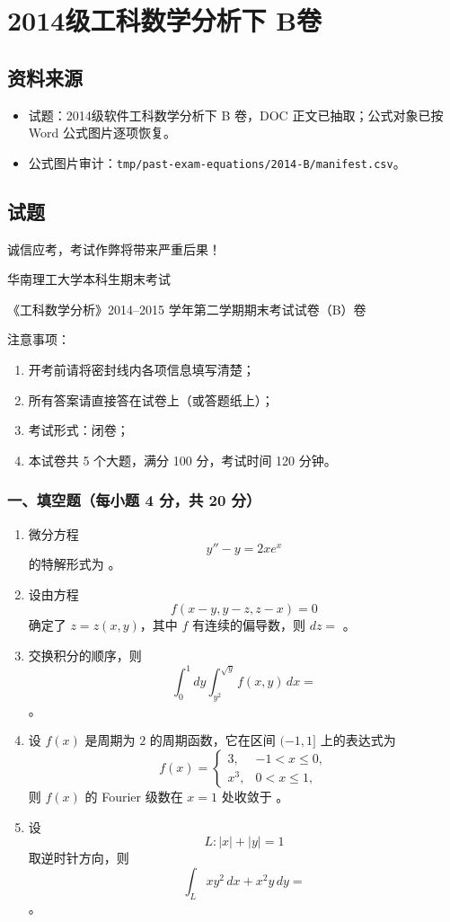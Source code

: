 \section{2014级工科数学分析下 B卷}

\subsection{资料来源}
\begin{itemize}
  \item 试题：2014级软件工科数学分析下 B 卷，DOC 正文已抽取；公式对象已按 Word 公式图片逐项恢复。
  \item 公式图片审计：\texttt{tmp/past-exam-equations/2014-B/manifest.csv}。
\end{itemize}

\subsection{试题}
诚信应考，考试作弊将带来严重后果！

华南理工大学本科生期末考试

《工科数学分析》2014--2015 学年第二学期期末考试试卷（B）卷

注意事项：
\begin{enumerate}
  \item 开考前请将密封线内各项信息填写清楚；
  \item 所有答案请直接答在试卷上（或答题纸上）；
  \item 考试形式：闭卷；
  \item 本试卷共 5 个大题，满分 100 分，考试时间 120 分钟。
\end{enumerate}

\subsubsection*{一、填空题（每小题 4 分，共 20 分）}
\begin{enumerate}
  \item 微分方程
  \[
  y''-y=2xe^x
  \]
  的特解形式为 \underline{\hspace{4cm}}。
  \item 设由方程
  \[
  f(x-y,y-z,z-x)=0
  \]
  确定了 $z=z(x,y)$，其中 $f$ 有连续的偏导数，则 $dz=$ \underline{\hspace{3cm}}。
  \item 交换积分的顺序，则
  \[
  \int_0^1dy\int_{y^2}^{\sqrt y}f(x,y)\,dx=
  \]
  \underline{\hspace{3cm}}。
  \item 设 $f(x)$ 是周期为 $2$ 的周期函数，它在区间 $(-1,1]$ 上的表达式为
  \[
  f(x)=
  \begin{cases}
  3,&-1<x\le0,\\
  x^3,&0<x\le1,
  \end{cases}
  \]
  则 $f(x)$ 的 Fourier 级数在 $x=1$ 处收敛于 \underline{\hspace{3cm}}。
  \item 设
  \[
  L:|x|+|y|=1
  \]
  取逆时针方向，则
  \[
  \int_L xy^2\,dx+x^2y\,dy=
  \]
  \underline{\hspace{3cm}}。
\end{enumerate}

